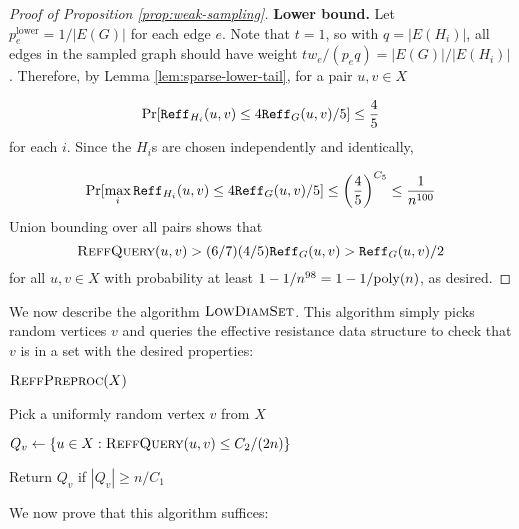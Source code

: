 \begin{proof}[Proof of Proposition \ref{prop:weak-sampling}]
\textbf{Lower bound.} Let $p_e^{\text{lower}} = 1/|E(G)|$ for each edge $e$. Note that $t = 1$, so with $q = |E(H_i)|$, all edges in the sampled graph should have weight $tw_e/(p_eq) = |E(G)|/|E(H_i)|$. Therefore, by Lemma \ref{lem:sparse-lower-tail}, for a pair $u,v\in X$

$$\Pr[\mathtt{Reff}_{H_i}(u,v) \le 4\mathtt{Reff}_G(u,v)/5]\le \frac{4}{5}$$
for each $i$. Since the $H_i$s are chosen independently and identically,

$$\Pr[\max_i \mathtt{Reff}_{H_i}(u,v) \le 4\mathtt{Reff}_G(u,v)/5]\le \left(\frac{4}{5}\right)^{C_5} \le \frac{1}{n^{100}}$$
Union bounding over all pairs shows that $$\textsc{ReffQuery}(u,v) > (6/7)(4/5)\mathtt{Reff}_G(u,v) > \mathtt{Reff}_G(u,v)/2$$ for all $u,v\in X$ with probability at least $1 - 1/n^{98} = 1 - 1/\mathrm{poly}(n)$, as desired.
\end{proof}

We now describe the algorithm $\textsc{LowDiamSet}$. This algorithm simply picks random vertices $v$ and queries the effective resistance data structure to check that $v$ is in a set with the desired properties:

\begin{algorithm}[!h]
\begin{algorithmic}[1]

    \State $\textsc{ReffPreproc}(X)$

    
        \State Pick a uniformly random vertex $v$ from $X$
        
        \State $Q_v\gets \{u\in X: \textsc{ReffQuery}(u,v) \le C_2/(2n)\}$
        
        \State Return $Q_v$ if $|Q_v| \ge n/C_1$
    
    \EndWhile

\EndProcedure
\end{algorithmic}
\end{algorithm}

We now prove that this algorithm suffices:

